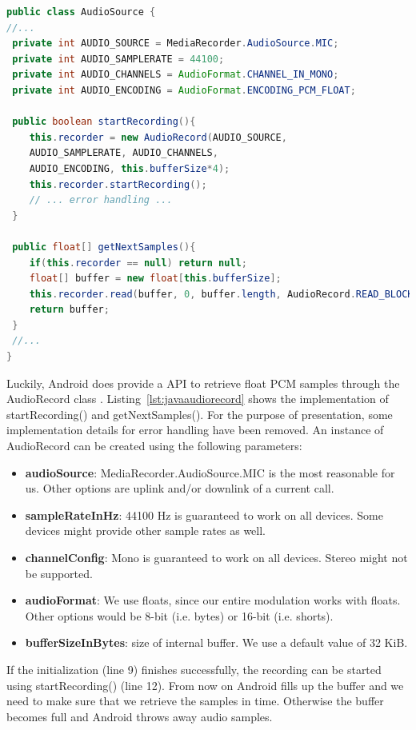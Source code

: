 \begin{lstlisting}[label=lst:javaaudiorecord, caption=Retrieving PCM Samples from the Microphone, language=java,]
public class AudioSource {
//...
 private int AUDIO_SOURCE = MediaRecorder.AudioSource.MIC;
 private int AUDIO_SAMPLERATE = 44100;
 private int AUDIO_CHANNELS = AudioFormat.CHANNEL_IN_MONO;
 private int AUDIO_ENCODING = AudioFormat.ENCODING_PCM_FLOAT;

 public boolean startRecording(){
    this.recorder = new AudioRecord(AUDIO_SOURCE,
	AUDIO_SAMPLERATE, AUDIO_CHANNELS,
	AUDIO_ENCODING, this.bufferSize*4);
    this.recorder.startRecording();
    // ... error handling ... 
 }

 public float[] getNextSamples(){
    if(this.recorder == null) return null;
    float[] buffer = new float[this.bufferSize];
    this.recorder.read(buffer, 0, buffer.length, AudioRecord.READ_BLOCKING);
    return buffer;
 }
 //...
}
\end{lstlisting}
Luckily, Android does provide a API to retrieve float PCM samples through the AudioRecord class \cite{androidaudio}. Listing~\ref{lst:javaaudiorecord} shows the implementation of startRecording() and getNextSamples(). For the purpose of presentation, some implementation details for error handling have been removed.  An instance of AudioRecord can be created using the following parameters: 
\begin{itemize}
	\item \textbf{audioSource}: MediaRecorder.AudioSource.MIC is the most reasonable for us. Other options are uplink and/or downlink of a current call. 
	\item \textbf{sampleRateInHz}: 44100 Hz is guaranteed to work on all devices. Some devices might provide other sample rates as well.
	\item \textbf{channelConfig}: Mono is guaranteed to work on all devices. Stereo might not be supported.
	\item \textbf{audioFormat}: We use floats, since our entire modulation works with floats. Other options would be 8-bit (i.e. bytes) or 16-bit (i.e. shorts). 
	\item \textbf{bufferSizeInBytes}: size of internal buffer. We use a default value of 32 KiB. 
\end{itemize}

If the initialization (line 9) finishes successfully, the recording can be started using startRecording() (line 12). From now on Android fills up the buffer and we need to make sure that we retrieve the samples in time. Otherwise the buffer becomes full and Android throws away audio samples. 

